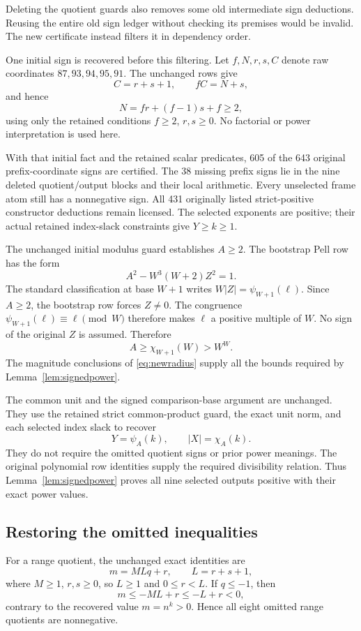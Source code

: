 Deleting the quotient guards also removes some old intermediate sign deductions. Reusing the entire old sign ledger without checking its premises would be invalid. The new certificate instead filters it in dependency order.

One initial sign is recovered before this filtering. Let \(f,N,r,s,C\) denote raw coordinates \(87,93,94,95,91\). The unchanged rows give
\[
C=r+s+1,\qquad fC=N+s,
\]
and hence
\[
N=fr+(f-1)s+f\ge2,
\]
using only the retained conditions \(f\ge2\), \(r,s\ge0\). No factorial or power interpretation is used here.

With that initial fact and the retained scalar predicates, 605 of the 643 original prefix-coordinate signs are certified. The 38 missing prefix signs lie in the nine deleted quotient/output blocks and their local arithmetic. Every unselected frame atom still has a nonnegative sign. All 431 originally listed strict-positive constructor deductions remain licensed. The selected exponents are positive; their actual retained index-slack constraints give \(Y\ge k\ge1\).

The unchanged initial modulus guard establishes \(A\ge2\). The bootstrap Pell row has the form
\[
A^2-W^3(W+2)Z^2=1.
\]
The standard classification at base \(W+1\) writes \(W|Z|=\psi_{W+1}(\ell)\). Since \(A\ge2\), the bootstrap row forces \(Z\ne0\). The congruence \(\psi_{W+1}(\ell)\equiv\ell\pmod W\) therefore makes \(\ell\) a positive multiple of \(W\). No sign of the original \(Z\) is assumed. Therefore
\[
A\ge\chi_{W+1}(W)>W^W.
\]
The magnitude conclusions of \eqref{eq:newradius} supply all the bounds required by Lemma~\ref{lem:signedpower}.

The common unit and the signed comparison-base argument are unchanged. They use the retained strict common-product guard, the exact unit norm, and each selected index slack to recover
\[
Y=\psi_A(k),\qquad |X|=\chi_A(k).
\]
They do not require the omitted quotient signs or prior power meanings. The original polynomial row identities supply the required divisibility relation. Thus Lemma~\ref{lem:signedpower} proves all nine selected outputs positive with their exact power values.

\subsection{Restoring the omitted inequalities}

For a range quotient, the unchanged exact identities are
\[
m=M Lq+r,\qquad L=r+s+1,
\]
where \(M\ge1\), \(r,s\ge0\), so \(L\ge1\) and \(0\le r<L\). If \(q\le-1\), then
\[
m\le-ML+r\le-L+r<0,
\]
contrary to the recovered value \(m=n^k>0\). Hence all eight omitted range quotients are nonnegative.

